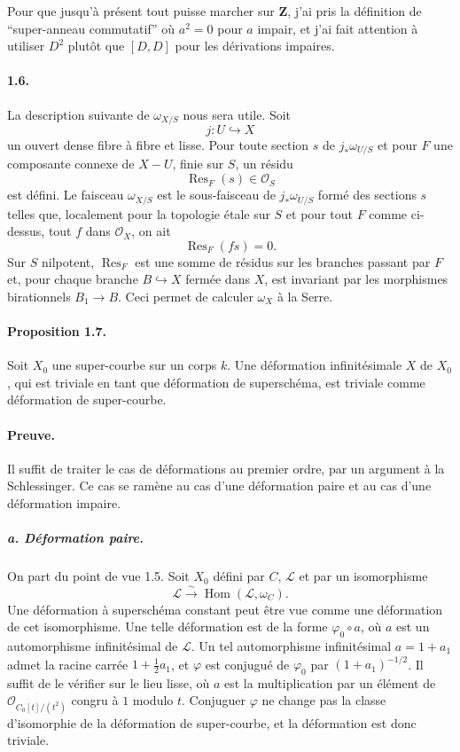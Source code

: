 \documentclass[11pt]{article}
\newcommand{\cO}{\mathcal O}
\newcommand{\cL}{\mathcal L}
\newcommand{\Hom}{\operatorname{Hom}}
\newcommand{\Res}{\operatorname{Res}}
\begin{document}
Pour que jusqu'à présent tout puisse marcher sur $\mathbf Z$, j'ai pris la définition de ``super-anneau commutatif'' où $a^2=0$ pour $a$ impair, et j'ai fait attention à utiliser $D^2$ plutôt que $[D,D]$ pour les dérivations impaires.

\paragraph{1.6.}
La description suivante de $\omega_{X/S}$ nous sera utile. Soit
\[
  j:U\hookrightarrow X
\]
un ouvert dense fibre à fibre et lisse. Pour toute section $s$ de $j_*\omega_{U/S}$ et pour $F$ une composante connexe de $X-U$, finie sur $S$, un résidu
\[
  \Res_F(s)\in\cO_S
\]
est défini. Le faisceau $\omega_{X/S}$ est le sous-faisceau de $j_*\omega_{U/S}$ formé des sections $s$ telles que, localement pour la topologie étale sur $S$ et pour tout $F$ comme ci-dessus, tout $f$ dans $\cO_X$, on ait
\[
  \Res_F(fs)=0.
\]
Sur $S$ nilpotent, $\Res_F$ est une somme de résidus sur les branches passant par $F$ et, pour chaque branche $B\hookrightarrow X$ fermée dans $X$, est invariant par les morphismes birationnels $B_1\to B$. Ceci permet de calculer $\omega_X$ à la Serre.

\paragraph{Proposition 1.7.}
Soit $X_0$ une super-courbe sur un corps $k$. Une déformation infinitésimale $X$ de $X_0$, qui est triviale en tant que déformation de superschéma, est triviale comme déformation de super-courbe.

\paragraph{Preuve.}
Il suffit de traiter le cas de déformations au premier ordre, par un argument à la Schlessinger. Ce cas se ramène au cas d'une déformation paire et au cas d'une déformation impaire.

\subparagraph{a. Déformation paire.}
On part du point de vue 1.5. Soit $X_0$ défini par $C$, $\cL$ et par un isomorphisme
\[
  \cL\xrightarrow{\sim}\Hom(\cL,\omega_C).
\]
Une déformation à superschéma constant peut être vue comme une déformation de cet isomorphisme. Une telle déformation est de la forme $\varphi_0\circ a$, où $a$ est un automorphisme infinitésimal de $\cL$. Un tel automorphisme infinitésimal $a=1+a_1$ admet la racine carrée $1+\frac12a_1$, et $\varphi$ est conjugué de $\varphi_0$ par $(1+a_1)^{-1/2}$. Il suffit de le vérifier sur le lieu lisse, où $a$ est la multiplication par un élément de $\cO_{C_0[t]/(t^2)}$ congru à $1$ modulo $t$. Conjuguer $\varphi$ ne change pas la classe d'isomorphie de la déformation de super-courbe, et la déformation est donc triviale.
\end{document}
